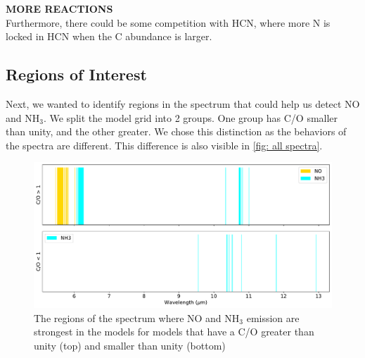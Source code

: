 \documentclass[twoside, single, authoryear, semicolon, 12pt]{lion-msc}
\newcommand{\4}{$_4$}
\newcommand{\3}{$_3$}
\newcommand{\2}{$_2$}
\begin{document}

\textbf{MORE REACTIONS}\\
Furthermore, there could be some competition with HCN, where more N is locked in HCN when the C abundance is larger. 

\subsection{Regions of Interest}
Next, we wanted to identify regions in the spectrum that could help us detect NO and NH\3. We split the model grid into 2 groups. One group has C/O smaller than unity, and the other greater. We chose this distinction as the behaviors of the spectra are different. This difference is also visible in \autoref{fig: all spectra}. 



\begin{figure}[H]
    \centering
    \includegraphics[width=\linewidth]{Figures/ClassificationCO.pdf}
    \caption{The regions of the spectrum where NO and NH\3 emission are strongest in the models for models that have a C/O greater than unity (top) and smaller than unity (bottom)}
    \label{fig: classes}
\end{figure}
\end{document}
